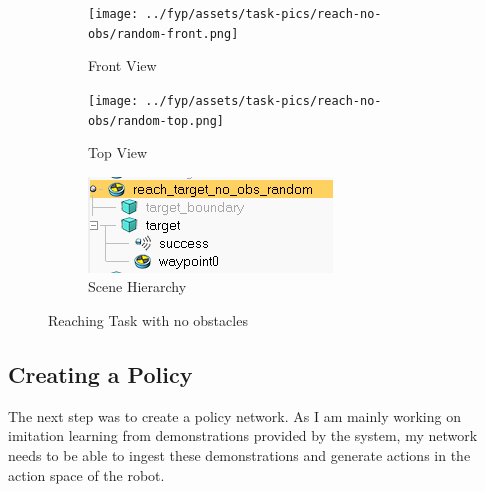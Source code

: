 \begin{figure}[htbp]
  \begin{subfigure}{0.48\linewidth}
    \centering
    \texttt{[image: ../fyp/assets/task-pics/reach-no-obs/random-front.png]}      
    \caption{Front View}
  \end{subfigure}%
  \hfill
  \begin{subfigure}{0.48\linewidth}
    \centering
    \texttt{[image: ../fyp/assets/task-pics/reach-no-obs/random-top.png]}
    \caption{Top View}
  \end{subfigure}
  \vspace{0.5em}
  \begin{subfigure}{1\linewidth}
    \centering
    \includegraphics[scale=0.5]{assets/early-work/random-scene-hierarchy.png}
    \caption{Scene Hierarchy}\label{fig:reach-no-obs-hierarchy}
  \end{subfigure}%
  \caption{Reaching Task with no obstacles}\label{fig:reach-no-obs}
\end{figure}

\subsection{Creating a Policy}

The next step was to create a policy network. As I am mainly working on imitation learning from demonstrations provided by the system, my network needs to be able to ingest these demonstrations and generate actions in the action space of the robot. \par

